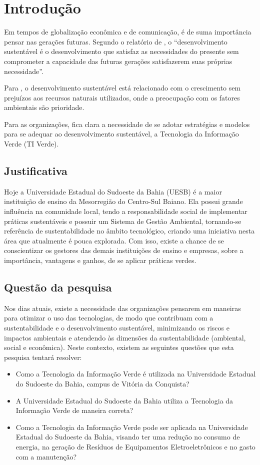 %
%

\chapter{Introdução}\label{chap:introducao}

Em tempos de globalização econômica e de comunicação, é de suma importância pensar nas gerações futuras. Segundo o relatório de , o ``desenvolvimento sustentável é o desenvolvimento que satisfaz as necessidades do presente sem comprometer a capacidade das futuras gerações satisfazerem suas próprias necessidade''. 

Para , o desenvolvimento sustentável está relacionado com o crescimento sem prejuízos aos recursos naturais utilizados, onde a preocupação com os fatores ambientais são prioridade. 

Para as organizações, fica clara a necessidade de se adotar estratégias e modelos para se adequar ao desenvolvimento sustentável, a Tecnologia da Informação Verde (TI Verde).

\section{Justificativa}

Hoje a Universidade Estadual do Sudoeste da Bahia (UESB) é a maior instituição de ensino da Mesorregião do Centro-Sul Baiano. Ela possui grande influência na comunidade local, tendo a responsabilidade social de implementar práticas sustentáveis e possuir um Sistema de Gestão Ambiental, tornando-se referência de sustentabilidade no âmbito tecnológico, criando uma iniciativa nesta área que atualmente é pouca explorada. Com isso, existe a chance de se conscientizar os gestores das demais instituições de ensino e empresas, sobre a importância, vantagens e ganhos, de se aplicar práticas verdes. 

\section{Questão da pesquisa}
Nos dias atuais, existe a necessidade das organizações pensarem em maneiras para otimizar o uso das tecnologias, de modo que contribuam com a sustentabilidade e o desenvolvimento sustentável, minimizando os riscos e impactos ambientais e atendendo às dimensões da sustentabilidade (ambiental, social e econômica). Neste contexto, existem as seguintes questões que esta pesquisa tentará resolver:
\begin{itemize}
    \item Como a Tecnologia da Informação Verde é utilizada na Universidade Estadual do Sudoeste da Bahia, campus de Vitória da Conquista?
    \item A Universidade Estadual do Sudoeste da Bahia utiliza a Tecnologia da Informação Verde de maneira correta?
    \item Como a Tecnologia da Informação Verde pode ser aplicada na Universidade Estadual do Sudoeste da Bahia, visando ter uma redução no consumo de energia, na geração de Resíduos de Equipamentos Eletroeletrônicos e no gasto com a manutenção?
\end{itemize}


